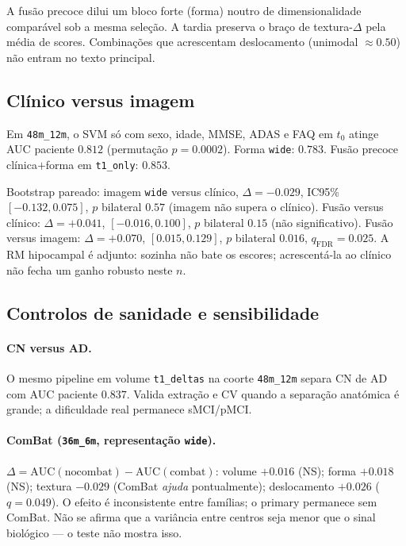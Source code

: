 \documentclass[review]{elsarticle}
\newcommand{\code}[1]{\texttt{#1}}
\begin{document}
	A fusão precoce dilui um bloco forte (forma) noutro de dimensionalidade comparável sob a mesma seleção.
	A tardia preserva o braço de textura-$\Delta$ pela média de scores.
	Combinações que acrescentam deslocamento (unimodal $\approx 0.50$) não entram no texto principal.
	
	\subsection{Clínico versus imagem}
	\label{subsec:clinico}
	
	Em \code{48m\_12m}, o SVM só com sexo, idade, MMSE, ADAS e FAQ em $t_0$ atinge AUC paciente $0.812$ (permutação $p=0.0002$).
	Forma \code{wide}: $0.783$.
	Fusão precoce clínica$+$forma em \code{t1\_only}: $0.853$.
	
	Bootstrap pareado: imagem \code{wide} versus clínico, $\Delta=-0.029$, IC95\% $[-0.132,0.075]$, $p$ bilateral $0.57$ (imagem não supera o clínico).
	Fusão versus clínico: $\Delta=+0.041$, $[-0.016,0.100]$, $p$ bilateral $0.15$ (não significativo).
	Fusão versus imagem: $\Delta=+0.070$, $[0.015,0.129]$, $p$ bilateral $0.016$, $q_{\mathrm{FDR}}=0.025$.
	A RM hipocampal é adjunto: sozinha não bate os escores; acrescentá-la ao clínico não fecha um ganho robusto neste $n$.
	
	\subsection{Controlos de sanidade e sensibilidade}
	\label{subsec:controlos}
	
	\paragraph{CN versus AD.}
	O mesmo pipeline em volume \code{t1\_deltas} na coorte \code{48m\_12m} separa CN de AD com AUC paciente $0.837$.
	Valida extração e CV quando a separação anatómica é grande; a dificuldade real permanece sMCI/pMCI.
	
	\paragraph{ComBat (\code{36m\_6m}, representação \code{wide}).}
	$\Delta=\mathrm{AUC}(\mathrm{nocombat})-\mathrm{AUC}(\mathrm{combat})$: volume $+0.016$ (NS); forma $+0.018$ (NS); textura $-0.029$ (ComBat \emph{ajuda} pontualmente); deslocamento $+0.026$ ($q=0.049$).
	O efeito é inconsistente entre famílias; o primary permanece sem ComBat.
	Não se afirma que a variância entre centros seja menor que o sinal biológico --- o teste não mostra isso.
	
\end{document}
